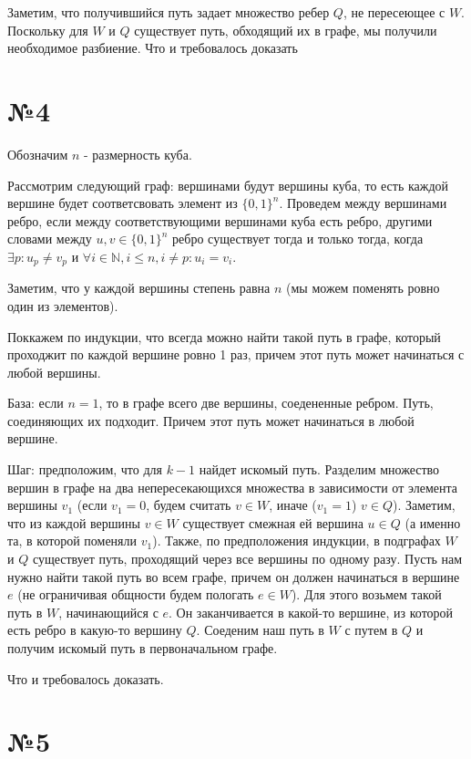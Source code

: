 \documentclass[12pt]{article}
\begin{document}
	Заметим, что получившийся путь задает множество ребер $Q$, 
	не пересеющее с $W$. Поскольку для $W$ и $Q$ существует путь, обходящий
	их в графе, мы получили необходимое разбиение. Что и требовалось доказать

	\section*{№4}
	Обозначим $n$ - размерность куба.
	
	Рассмотрим следующий граф: вершинами будут вершины куба, 
	то есть каждой вершине будет соответсвовать элемент из $\{0, 1\}^n$.
	Проведем между вершинами ребро, если между соответствующими вершинами 
	куба есть ребро, другими словами между $u, v \in \{0, 1\}^n$ ребро
	существует тогда и только тогда, когда 
	$ \exists  p: u_p \neq v_p$ и $\forall i \in \mathbb{N}, i \leqslant n,
	i \neq p : u_i=v_i$.
	
	Заметим, что у каждой вершины степень равна $n$ 
	(мы можем поменять ровно один из элементов).
	
	Поккажем по индукции, что всегда можно найти такой путь в графе, 
	который проходжит по каждой вершине ровно 1 раз, 
	причем этот путь может начинаться с любой вершины.
	
	База: если $n = 1$, то в графе всего две вершины, соедененные ребром.
	Путь, соединяющих их подходит. 
	Причем этот путь может начинаться в любой вершине.
	
	Шаг: предположим, что для $k - 1$ найдет искомый путь. 
	Разделим множество вершин в графе на два непересекающихся множества
	в зависимости от элемента вершины $v_1$ 
	(если $v_1 = 0$, будем считать $v \in W$, иначе ($v_1=1$) $v \in Q$).
	Заметим, что из каждой вершины $v \in W$ существует смежная ей вершина $u \in Q$ (а именно та, в которой поменяли $v_1$). 
	Также, по предположения индукции, в подграфах $W$ и $Q$ существует 
	путь, проходящий через все вершины по одному разу. 
	Пусть нам нужно найти такой путь во всем графе, 
	причем он должен начинаться в вершине $e$ 
	(не ограничивая общности будем пологать $e \in W$).
	Для этого возьмем такой путь в $W$, начинающийся с $e$.
	Он заканчивается в какой-то вершине, из которой есть ребро в 
	какую-то вершину $Q$. Соеденим наш путь в $W$ с путем в $Q$ и получим искомый путь в первоначальном графе.
	
	Что и требовалось доказать.
	
	\section*{№5}
	 
\end{document}
